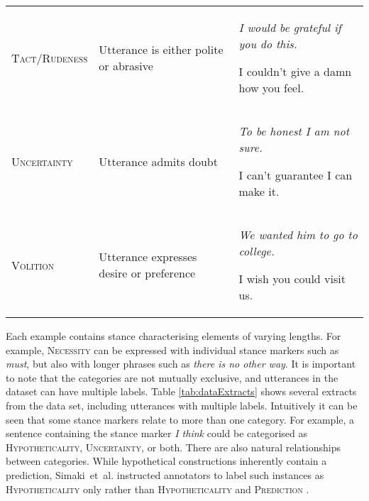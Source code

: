 \documentclass[Dissertation.tex]{subfiles}
\begin{document}
{\begin{table}[]
\begin{tabularx}{\textwidth}{>{\raggedright}p{3cm} >{\raggedright}p{5.5cm} X}
			\small\scshape Tact/Rudeness          & Utterance is either  polite or abrasive           & \itshape I would be grateful if you do this.\par I couldn’t give a damn how you feel.                           \\
			\small\scshape Uncertainty            & Utterance admits doubt                                 & \itshape To be honest I am not sure.\par I can’t guarantee I can make it.                                       \\ 
			\small\scshape Volition & Utterance  expresses desire or preference &  \itshape We wanted him to go to college. \par I wish you could visit us.\\
			\bottomrule
		\end{tabularx}

\end{table}}

Each example contains stance characterising elements of varying lengths. For example, {\small\scshape Necessity} can be expressed with individual stance markers such as \textit{must}, but also with longer phrases such as \textit{there is no other way}. It is important to note that the categories are not mutually exclusive, and utterances in the dataset can have multiple labels. Table \ref{tab:dataExtracts} shows several extracts from the data set, including utterances with multiple labels. Intuitively it can be seen that some stance markers relate to more than one category. For example, a sentence containing the stance marker \textit{I think} could be categorised as {\small \scshape Hypotheticality}, {\small \scshape Uncertainty}, or both. There are also natural relationships between categories. While hypothetical constructions inherently contain a prediction, Simaki~et~al. instructed annotators to label such instances as {\small \scshape Hypotheticality} only rather than {\small \scshape Hypotheticality} and {\small \scshape Prediction} \cite{simakiAnnotatingSpeakerStance2017}.
\end{document}
